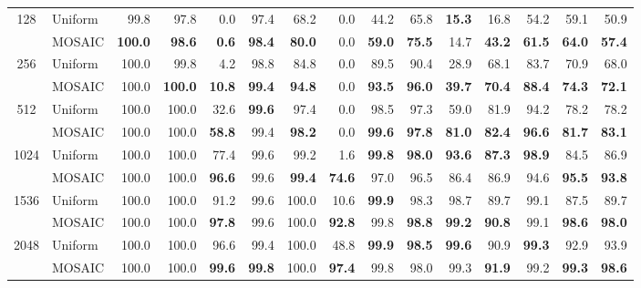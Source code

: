 \begin{table}[tp]
\begin{tabular}{@{} c l rrrrrrrrrrrrr @{}}
    \cmidrule(l){1-15}
    \multirow{2}{*}{128} & Uniform & 99.8 & 97.8 & 0.0 & 97.4 & 68.2 & 0.0 & 44.2 & 65.8 & \textbf{15.3} & 16.8 & 54.2 & 59.1 & 50.9 \\
     & MOSAIC & \textbf{100.0} & \textbf{98.6} & \textbf{0.6} & \textbf{98.4} & \textbf{80.0} & 0.0 & \textbf{59.0} & \textbf{75.5} & 14.7 & \textbf{43.2} & \textbf{61.5} & \textbf{64.0} & \textbf{57.4} \\
    \cmidrule(l){1-15}
    \multirow{2}{*}{256} & Uniform & 100.0 & 99.8 & 4.2 & 98.8 & 84.8 & 0.0 & 89.5 & 90.4 & 28.9 & 68.1 & 83.7 & 70.9 & 68.0 \\
     & MOSAIC & 100.0 & \textbf{100.0} & \textbf{10.8} & \textbf{99.4} & \textbf{94.8} & 0.0 & \textbf{93.5} & \textbf{96.0} & \textbf{39.7} & \textbf{70.4} & \textbf{88.4} & \textbf{74.3} & \textbf{72.1} \\
    \cmidrule(l){1-15}
    \multirow{2}{*}{512} & Uniform & 100.0 & 100.0 & 32.6 & \textbf{99.6} & 97.4 & 0.0 & 98.5 & 97.3 & 59.0 & 81.9 & 94.2 & 78.2 & 78.2 \\
     & MOSAIC & 100.0 & 100.0 & \textbf{58.8} & 99.4 & \textbf{98.2} & 0.0 & \textbf{99.6} & \textbf{97.8} & \textbf{81.0} & \textbf{82.4} & \textbf{96.6} & \textbf{81.7} & \textbf{83.1} \\
    \cmidrule(l){1-15}
    \multirow{2}{*}{1024} & Uniform & 100.0 & 100.0 & 77.4 & 99.6 & 99.2 & 1.6 & \textbf{99.8} & \textbf{98.0} & \textbf{93.6} & \textbf{87.3} & \textbf{98.9} & 84.5 & 86.9 \\
     & MOSAIC & 100.0 & 100.0 & \textbf{96.6} & 99.6 & \textbf{99.4} & \textbf{74.6} & 97.0 & 96.5 & 86.4 & 86.9 & 94.6 & \textbf{95.5} & \textbf{93.8} \\
    \cmidrule(l){1-15}
    \multirow{2}{*}{1536} & Uniform & 100.0 & 100.0 & 91.2 & 99.6 & 100.0 & 10.6 & \textbf{99.9} & 98.3 & 98.7 & 89.7 & 99.1 & 87.5 & 89.7 \\
     & MOSAIC & 100.0 & 100.0 & \textbf{97.8} & 99.6 & 100.0 & \textbf{92.8} & 99.8 & \textbf{98.8} & \textbf{99.2} & \textbf{90.8} & 99.1 & \textbf{98.6} & \textbf{98.0} \\
    \cmidrule(l){1-15}
    \multirow{2}{*}{2048} & Uniform & 100.0 & 100.0 & 96.6 & 99.4 & 100.0 & 48.8 & \textbf{99.9} & \textbf{98.5} & \textbf{99.6} & 90.9 & \textbf{99.3} & 92.9 & 93.9 \\
     & MOSAIC & 100.0 & 100.0 & \textbf{99.6} & \textbf{99.8} & 100.0 & \textbf{97.4} & 99.8 & 98.0 & 99.3 & \textbf{91.9} & 99.2 & \textbf{99.3} & \textbf{98.6} \\

\end{tabular}
\end{table}

